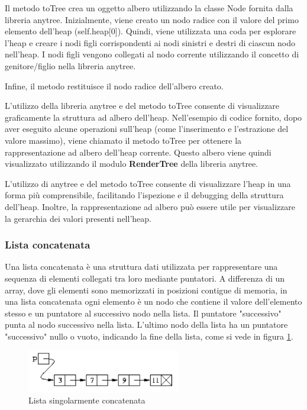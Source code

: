 \documentclass{article}
\begin{document}
Il metodo toTree crea un oggetto albero utilizzando la classe Node fornita dalla libreria anytree. Inizialmente, viene creato un nodo radice con il valore del primo elemento dell'heap (self.heap[0]). Quindi, viene utilizzata una coda per esplorare l'heap e creare i nodi figli corrispondenti ai nodi sinistri e destri di ciascun nodo nell'heap. I nodi figli vengono collegati al nodo corrente utilizzando il concetto di genitore/figlio nella libreria anytree.

Infine, il metodo restituisce il nodo radice dell'albero creato.

L'utilizzo della libreria anytree e del metodo toTree consente di visualizzare graficamente la struttura ad albero dell'heap. Nell'esempio di codice fornito, dopo aver eseguito alcune operazioni sull'heap (come l'inserimento e l'estrazione del valore massimo), viene chiamato il metodo toTree per ottenere la rappresentazione ad albero dell'heap corrente. Questo albero viene quindi visualizzato utilizzando il modulo \textbf{RenderTree} della libreria anytree.

L'utilizzo di anytree e del metodo toTree consente di visualizzare l'heap in una forma più comprensibile, facilitando l'ispezione e il debugging della struttura dell'heap. Inoltre, la rappresentazione ad albero può essere utile per visualizzare la gerarchia dei valori presenti nell'heap.

\subsubsection{Lista concatenata}
Una lista concatenata è una struttura dati utilizzata per rappresentare una sequenza di elementi collegati tra loro mediante puntatori. A differenza di un array, dove gli elementi sono memorizzati in posizioni contigue di memoria, in una lista concatenata ogni elemento è un nodo che contiene il valore dell'elemento stesso e un puntatore al successivo nodo nella lista. Il puntatore "successivo" punta al nodo successivo nella lista. L'ultimo nodo della lista ha un puntatore "successivo" nullo o vuoto, indicando la fine della lista, come si vede in figura \ref{fig: Linked1}.

\begin{figure}[H]
    \includegraphics[width=0.6\textwidth]{Images/Linked1.png}
    \centering
    \caption{Lista singolarmente concatenata}
    \label{fig: Linked1}
\end{figure}
\end{document}
